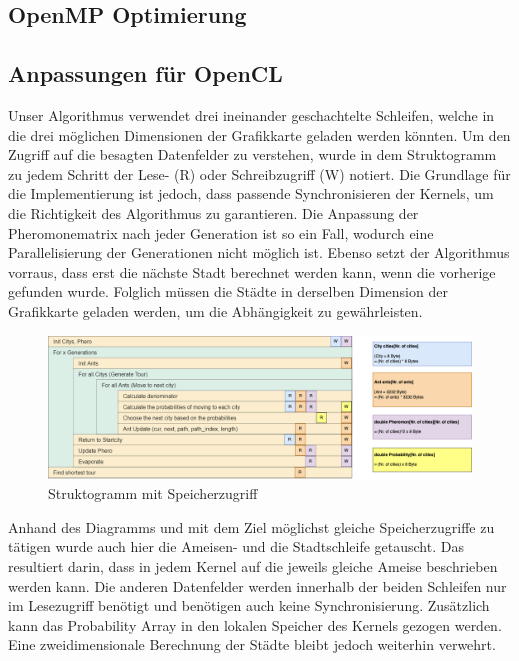 \subsection*{OpenMP Optimierung}

\subsection*{Anpassungen für OpenCL}

Unser Algorithmus verwendet drei ineinander geschachtelte Schleifen, welche in die drei möglichen Dimensionen der Grafikkarte geladen werden könnten.
Um den Zugriff auf die besagten Datenfelder zu verstehen, wurde in dem Struktogramm zu jedem Schritt der Lese- (R) oder Schreibzugriff (W) notiert. 
Die Grundlage für die Implementierung ist jedoch, dass passende Synchronisieren der Kernels, um die Richtigkeit des Algorithmus zu garantieren.
Die Anpassung der Pheromonematrix nach jeder Generation ist so ein Fall, wodurch eine Parallelisierung der Generationen nicht möglich ist. 
Ebenso setzt der Algorithmus vorraus, dass erst die nächste Stadt berechnet werden kann, wenn die vorherige gefunden wurde. 
Folglich müssen die Städte in derselben Dimension der Grafikkarte geladen werden, um die Abhängigkeit zu gewährleisten.

\begin{figure}[h]
    \centering
    \includegraphics[width=\textwidth]{../images/Speicherzugriff.png}
    \caption{Struktogramm mit Speicherzugriff}
    \label{fig:struktogramm-speicher}
\end{figure}

Anhand des Diagramms und mit dem Ziel möglichst gleiche Speicherzugriffe zu tätigen wurde auch hier die Ameisen- und die Stadtschleife getauscht. 
Das resultiert darin, dass in jedem Kernel auf die jeweils gleiche Ameise beschrieben werden kann.
Die anderen Datenfelder werden innerhalb der beiden Schleifen nur im Lesezugriff benötigt und benötigen auch keine Synchronisierung.
Zusätzlich kann das Probability Array in den lokalen Speicher des Kernels gezogen werden. 
Eine zweidimensionale Berechnung der Städte bleibt jedoch weiterhin verwehrt.

